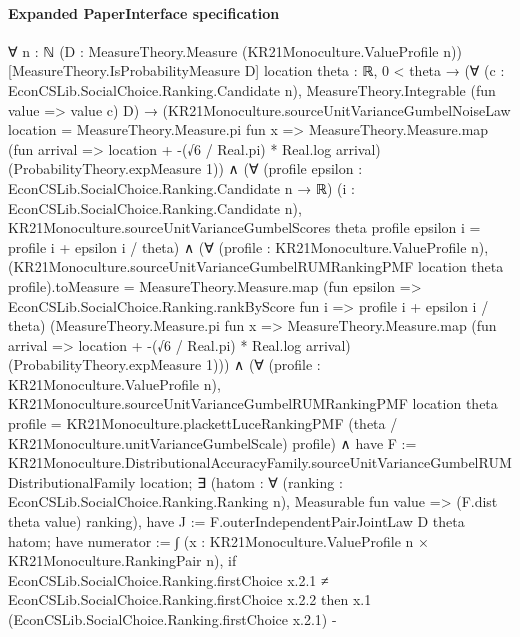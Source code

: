 \documentclass[10pt]{article}
\begin{document}
\paragraph{Expanded PaperInterface specification}
\begin{ReviewVerbatim}
∀ {n : ℕ} (D : MeasureTheory.Measure (KR21Monoculture.ValueProfile n)) [MeasureTheory.IsProbabilityMeasure D]
  {location theta : ℝ},
  0 < theta →
    (∀ (c : EconCSLib.SocialChoice.Ranking.Candidate n), MeasureTheory.Integrable (fun value => value c) D) →
      (KR21Monoculture.sourceUnitVarianceGumbelNoiseLaw location =
          MeasureTheory.Measure.pi fun x =>
            MeasureTheory.Measure.map (fun arrival => location + -(√6 / Real.pi) * Real.log arrival)
              (ProbabilityTheory.expMeasure 1)) ∧
        (∀ (profile epsilon : EconCSLib.SocialChoice.Ranking.Candidate n → ℝ)
            (i : EconCSLib.SocialChoice.Ranking.Candidate n),
            KR21Monoculture.sourceUnitVarianceGumbelScores theta profile epsilon i = profile i + epsilon i / theta) ∧
          (∀ (profile : KR21Monoculture.ValueProfile n),
              (KR21Monoculture.sourceUnitVarianceGumbelRUMRankingPMF location theta profile).toMeasure =
                MeasureTheory.Measure.map
                  (fun epsilon => EconCSLib.SocialChoice.Ranking.rankByScore fun i => profile i + epsilon i / theta)
                  (MeasureTheory.Measure.pi fun x =>
                    MeasureTheory.Measure.map (fun arrival => location + -(√6 / Real.pi) * Real.log arrival)
                      (ProbabilityTheory.expMeasure 1))) ∧
            (∀ (profile : KR21Monoculture.ValueProfile n),
                KR21Monoculture.sourceUnitVarianceGumbelRUMRankingPMF location theta profile =
                  KR21Monoculture.plackettLuceRankingPMF (theta / KR21Monoculture.unitVarianceGumbelScale) profile) ∧
              have F :=
                KR21Monoculture.DistributionalAccuracyFamily.sourceUnitVarianceGumbelRUMDistributionalFamily location;
              ∃ (hatom :
                ∀ (ranking : EconCSLib.SocialChoice.Ranking.Ranking n),
                  Measurable fun value => (F.dist theta value) ranking),
                have J := F.outerIndependentPairJointLaw D theta hatom;
                have numerator :=
                  ∫ (x : KR21Monoculture.ValueProfile n × KR21Monoculture.RankingPair n),
                    if
                        EconCSLib.SocialChoice.Ranking.firstChoice x.2.1 ≠
                          EconCSLib.SocialChoice.Ranking.firstChoice x.2.2 then
                      x.1 (EconCSLib.SocialChoice.Ranking.firstChoice x.2.1) -

\end{ReviewVerbatim}
\end{document}
